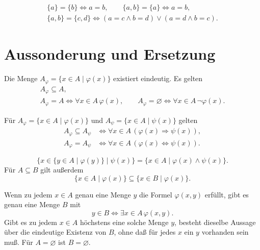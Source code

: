 \begin{theorem}
\[
\begin{gathered}
 \{a\}=\{b\}\Longleftrightarrow a=b,\qquad
 \{a,b\}=\{a\}\Longleftrightarrow a=b,\\
 \{a,b\}=\{c,d\}\Longleftrightarrow
       (a=c\land b=d)\lor(a=d\land b=c).
\end{gathered}
\]
\end{theorem}

\section{Aussonderung und Ersetzung}

\begin{theorem}
Die Menge $A_\varphi=\{x\in A\mid\varphi(x)\}$ existiert eindeutig.
Es gelten
\[
\begin{gathered}
 A_\varphi\subseteq A,\\
 A_\varphi=A\Longleftrightarrow\forall x\in A\,\varphi(x),\qquad
 A_\varphi=\varnothing\Longleftrightarrow
                       \forall x\in A\,\neg\varphi(x).
\end{gathered}
\]
\end{theorem}

\begin{theorem}
Für $A_\varphi=\{x\in A\mid\varphi(x)\}$ und
$A_\psi=\{x\in A\mid\psi(x)\}$ gelten
\[
\begin{aligned}
 A_\varphi\subseteq A_\psi
   &\Longleftrightarrow
        \forall x\in A\,(\varphi(x)\Rightarrow\psi(x)),\\
 A_\varphi=A_\psi
   &\Longleftrightarrow
        \forall x\in A\,(\varphi(x)\Longleftrightarrow\psi(x)).
\end{aligned}
\]
\end{theorem}

\begin{theorem}
\[
 \{x\in\{y\in A\mid\varphi(y)\}\mid\psi(x)\}
       =\{x\in A\mid\varphi(x)\land\psi(x)\}.
\]
Für $A\subseteq B$ gilt außerdem
\[
 \{x\in A\mid\varphi(x)\}\subseteq\{x\in B\mid\varphi(x)\}.
\]
\end{theorem}

\begin{theorem}
\label{b03guide:thm:termcollection}
Wenn zu jedem $x\in A$ genau eine Menge $y$ die Formel
$\varphi(x,y)$ erfüllt, gibt es genau eine Menge $B$ mit
\[
 y\in B\Longleftrightarrow\exists x\in A\,\varphi(x,y).
\]
Gibt es zu jedem $x\in A$ höchstens eine solche Menge $y$, besteht
dieselbe Aussage über die eindeutige Existenz von $B$, ohne daß für jedes $x$ ein
$y$ vorhanden sein muß. Für $A=\varnothing$ ist $B=\varnothing$.
\end{theorem}


